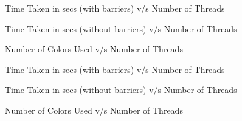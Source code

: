 \documentclass[a4paper,11pt]{article}
\begin{document}
\begin{center}
\begin{figure}[H]
 \vspace{-0.9cm}
 \centering
 \caption{Time Taken in secs (with barriers) v/s Number of Threads}
\label{live1}
 \end{figure}
\end{center}
\vspace{-1.5cm}
\begin{center}
\begin{figure}[H]
 \vspace{-0.9cm}
 \caption{Time Taken in secs (without barriers) v/s Number of Threads}
\label{live2}
 \end{figure}
\end{center}
\vspace{-1.4cm}
\begin{center}
\begin{figure}[H]
 \vspace{-0.9cm}
 \caption{Number of Colors Used v/s Number of Threads}
\label{live3}
 \end{figure}
\end{center}
\vspace{-1.2cm}
\begin{center}
\begin{figure}[H]
 \vspace{-0.9cm}
 \caption{Time Taken in secs (with barriers) v/s Number of Threads}
\label{orkut1}
 \end{figure}
\end{center}
\vspace{-1.5cm}
\begin{center}
\begin{figure}[H]
 \vspace{-0.9cm}
 \caption{Time Taken in secs (without barriers) v/s Number of Threads}
\label{orkut2}
 \end{figure}
\end{center}
\vspace{-1.5cm}
\begin{center}
\begin{figure}[H]
 \vspace{-0.9cm}
 \caption{Number of Colors Used v/s Number of Threads}
\label{orkut3}
 \end{figure}
\end{center}
\vspace{-1cm}
\end{document}
